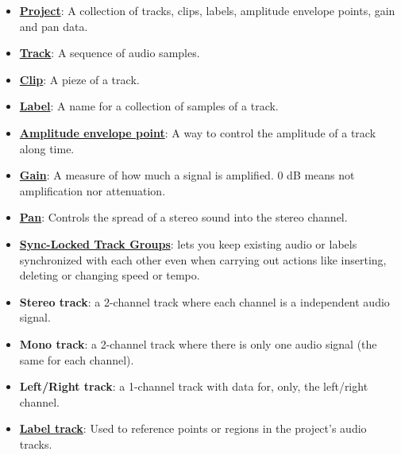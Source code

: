 \begin{itemize}
\item
  \href{http://manual.audacityteam.org/o/man/audacity_projects.html}{\textbf{Project}}:
  A collection of tracks, clips, labels, amplitude envelope points,
  gain and pan data.

\item \href{http://manual.audacityteam.org/o/man/tracks.html}{\textbf{Track}}:
  A sequence of audio samples.

\item
  \href{http://manual.audacityteam.org/o/man/audacity_tracks_and_clips.html}{\textbf{Clip}}:
  A pieze of a track.

\item
  \href{http://manual.audacityteam.org/o/man/label_tracks.html}{\textbf{Label}}:
  A name for a collection of samples of a track.

\item
  \href{http://manual.audacityteam.org/o/man/envelope_tool.html}{\textbf{Amplitude
      envelope point}}: A way to control the amplitude of a track
  along time.

\item
  \href{http://manual.audacityteam.org/o/man/glossary.html#gain}{\textbf{Gain}}:
  A measure of how much a signal is amplified. 0 dB means not
  amplification nor attenuation.

\item
  \href{http://manual.audacityteam.org/o/man/glossary.html#pan}{\textbf{Pan}}:
  Controls the spread of a stereo sound into the stereo channel.

\item
  \href{http://manual.audacityteam.org/o/man/sync_locked_track_groups.html}{\textbf{Sync-Locked
    Track Groups}}: lets you keep existing audio or labels synchronized
  with each other even when carrying out actions like inserting,
  deleting or changing speed or tempo.

\item \textbf{Stereo track}: a 2-channel track where each channel is a
  independent audio signal.

\item \textbf{Mono track}: a 2-channel track where there is only one
  audio signal (the same for each channel).

\item \textbf{Left/Right track}: a 1-channel track with data for, only, the
  left/right channel.

\item
  \href{http://manual.audacityteam.org/o/man/label_tracks.html}{\textbf{Label
    track}}: Used to reference points or regions in the project's audio
  tracks.


\end{itemize}
